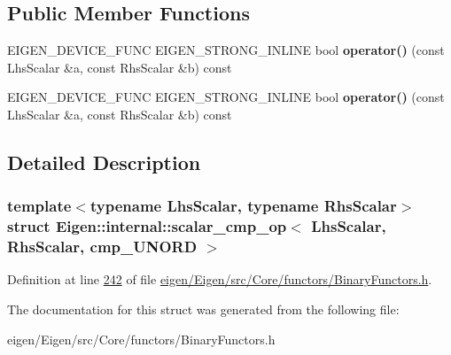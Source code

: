 \subsection*{Public Member Functions}
\begin{DoxyCompactItemize}
\item 
\mbox{\label{struct_eigen_1_1internal_1_1scalar__cmp__op_3_01_lhs_scalar_00_01_rhs_scalar_00_01cmp___u_n_o_r_d_01_4_a2213652b1816181cef1d17c3b57b7e73}} 
E\+I\+G\+E\+N\+\_\+\+D\+E\+V\+I\+C\+E\+\_\+\+F\+U\+NC E\+I\+G\+E\+N\+\_\+\+S\+T\+R\+O\+N\+G\+\_\+\+I\+N\+L\+I\+NE bool {\bfseries operator()} (const Lhs\+Scalar \&a, const Rhs\+Scalar \&b) const
\item 
\mbox{\label{struct_eigen_1_1internal_1_1scalar__cmp__op_3_01_lhs_scalar_00_01_rhs_scalar_00_01cmp___u_n_o_r_d_01_4_a2213652b1816181cef1d17c3b57b7e73}} 
E\+I\+G\+E\+N\+\_\+\+D\+E\+V\+I\+C\+E\+\_\+\+F\+U\+NC E\+I\+G\+E\+N\+\_\+\+S\+T\+R\+O\+N\+G\+\_\+\+I\+N\+L\+I\+NE bool {\bfseries operator()} (const Lhs\+Scalar \&a, const Rhs\+Scalar \&b) const
\end{DoxyCompactItemize}


\subsection{Detailed Description}
\subsubsection*{template$<$typename Lhs\+Scalar, typename Rhs\+Scalar$>$\newline
struct Eigen\+::internal\+::scalar\+\_\+cmp\+\_\+op$<$ Lhs\+Scalar, Rhs\+Scalar, cmp\+\_\+\+U\+N\+O\+R\+D $>$}



Definition at line \hyperlink{eigen_2_eigen_2src_2_core_2functors_2_binary_functors_8h_source_l00242}{242} of file \hyperlink{eigen_2_eigen_2src_2_core_2functors_2_binary_functors_8h_source}{eigen/\+Eigen/src/\+Core/functors/\+Binary\+Functors.\+h}.



The documentation for this struct was generated from the following file\+:\begin{DoxyCompactItemize}
\item 
eigen/\+Eigen/src/\+Core/functors/\+Binary\+Functors.\+h\end{DoxyCompactItemize}
